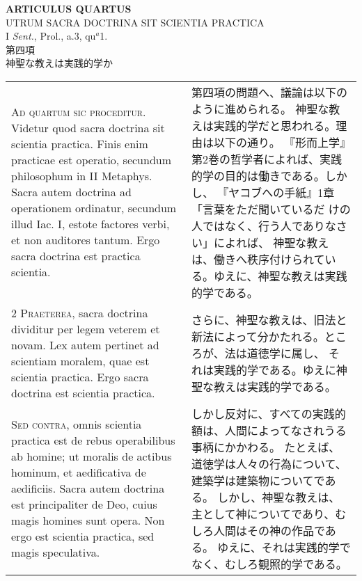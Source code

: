 \documentclass[10pt]{jsarticle} %
\begin{document}
\newpage



\begin{center}
 {\Large {\bf ARTICULUS QUARTUS}}\\
 {\large UTRUM SACRA DOCTRINA SIT SCIENTIA PRACTICA}\\
 {\footnotesize I {\itshape Sent.}, Prol., a.3, qu$^a$1.}\\
 {\Large 第四項\\神聖な教えは実践的学か}
\end{center}

\begin{longtable}{p{21em}p{21em}}

{\Huge A}{\scshape d quartum sic proceditur}. Videtur quod sacra
 doctrina sit scientia practica. Finis enim practicae est operatio,
 secundum philosophum in II Metaphys. Sacra autem doctrina ad
 operationem ordinatur, secundum illud Iac. I, estote factores verbi, et
 non auditores tantum. Ergo sacra doctrina est practica scientia.



&

第四項の問題へ、議論は以下のように進められる。
神聖な教えは実践的学だと思われる。理由は以下の通り。
『形而上学』第2巻の哲学者によれば、実践的学の目的は働きである。しかし、
『ヤコブへの手紙』1章「言葉をただ聞いているだ
 けの人ではなく、行う人でありなさい」によれば、
 神聖な教えは、働きへ秩序付けられている。ゆえに、神聖な教えは実践的学である。


\\


{\scshape 2 Praeterea}, sacra doctrina dividitur per
legem veterem et novam. Lex autem pertinet ad scientiam moralem, quae
est scientia practica. Ergo sacra doctrina est scientia practica.


&

さらに、神聖な教えは、旧法と新法によって分かたれる。ところが、法は道徳学に属し、
 それは実践的学である。ゆえに神聖な教えは実践的学である。



\\


{\scshape Sed contra}, omnis scientia practica est de
rebus operabilibus ab homine; ut moralis de actibus hominum, et
aedificativa de aedificiis. Sacra autem doctrina est principaliter de
Deo, cuius magis homines sunt opera. Non ergo est scientia practica, sed
magis speculativa.


&

しかし反対に、すべての実践的額は、人間によってなされうる事柄にかかわる。
 たとえば、道徳学は人々の行為について、建築学は建築物についてである。
しかし、神聖な教えは、主として神についてであり、むしろ人間はその神の作品である。
 ゆえに、それは実践的学でなく、むしろ観照的学である。



\end{longtable}
\end{document}
